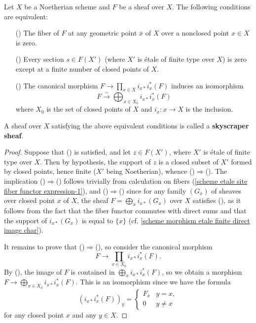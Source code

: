 \begin{proposition}\label{scheme Noe skyscraper sheaf char}
Let $X$ be a Noetherian scheme and $F$ be a sheaf over $X$. The following conditions are equivalent:
\begin{enumerate}
    \item[(\rmnum{1})] The fiber of $F$ at any geometric point $\bar{x}$ of $X$ over a nonclosed point $x\in X$ is zero.
    \item[(\rmnum{2})] Every section $s\in F(X')$ (where $X'$ is \'etale of finite type over $X$) is zero except at a finite number of closed points of $X$.
    \item[(\rmnum{3})] The canonical morphism $F\to\prod_{x\in X}i_{x*}i_x^*(F)$ induces an isomorphism
    \[F \stackrel{\sim}{\to} \bigoplus_{x\in X_0}i_{x*}i_x^*(F)\]
    where $X_0$ is the set of closed points of $X$ and $i_x:x\to X$ is the inclusion.
\end{enumerate}
A sheaf over $X$ satisfying the above equivalent conditions is called a \textbf{skyscraper sheaf}.
\end{proposition}
\begin{proof}
Suppose that () is satisfied, and let $z\in F(X')$, where $X'$ is \'etale of finite type over $X$. Then by hypothesis, the support of $z$ is a closed subset of $X'$ formed by closed points, hence finite ($X'$ being Noetherian), whence ()$\Rightarrow$(). The implication ()$\Rightarrow$() follows trivially from calculation on fibers (\ref{scheme etale site fiber functor expression-1}), and ()$\Rightarrow$() since for any family $(G_x)$ of sheaves over closed point $x$ of $X$, the sheaf $F=\bigoplus_xi_{x*}(G_x)$ over $X$ satisfies (), as it follows from the fact that the fiber functor commutes with direct sums and that the support of $i_{x*}(G_x)$ is equal to $\{x\}$ (cf. \cref{scheme morphism etale finite direct image char}).\par
It remains to prove that ()$\Rightarrow$(), so consider the canonical morphism
\[F\to \prod_{x\in X_0}i_{x*}i_x^*(F).\]
By (), the image of $F$ is contained in $\bigoplus_xi_{x*}i_x^*(F)$, so we obtain a morphism $F\to\bigoplus_{x\in X_0}i_{x*}i_x^*(F)$. This is an isomorphism since we have the formula
\[(i_{x*}i_x^*(F))_{\bar{y}}=\begin{cases}
F_{\bar{x}}&y=x,\\
0&y\neq x
\end{cases}\]
for any closed point $x$ and any $y\in X$.
\end{proof}

